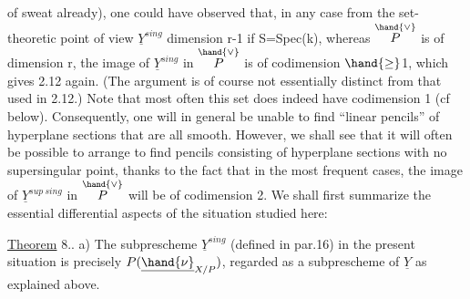 
 of sweat already), one could have observed that,  in
any case from the set-theoretic point of view $\underline{Y}^{sing}$  dimension
r-1  if S=Spec(k), whereas $\overset{\hand{\vee}}{P}$ is of dimension
r,  the image of $\underline{Y}^{sing}$ in $\overset{\hand{\vee}}{P}$ is of codimension $\hand{\geq}$1, which gives
2.12 again. (The argument is of course not essentially distinct from
that used in 2.12.) Note that most often this set
does indeed have codimension 1 (cf below). Consequently, one will in general
be unable to find “linear pencils” of hyperplane sections
that are all   smooth. However, we shall see that
it will often be possible to arrange  to find pencils consisting of hyperplane
sections with no supersingular point, thanks to the fact that
in the most frequent cases, the image of $\underline{Y}^{sup\ sing}$ in $\overset{\hand{\vee}}{P}$ will be of
codimension 2. We shall first summarize the essential
differential aspects of the situation studied here:

\uline{Theorem} 8.. a) The subprescheme $\underline{Y}^{sing}$ (defined in par.16) in
the present situation is precisely $P(\underline{\hand{\nu}}_{X/P})$, regarded as
a subprescheme of $\underline{Y}$ as explained above.

